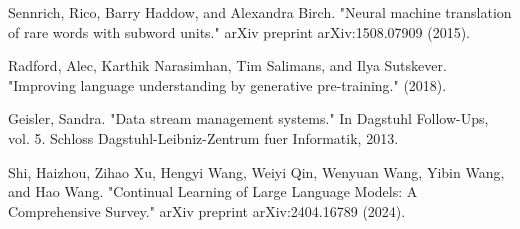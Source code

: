 \documentclass[t]{beamer}
\begin{document}
\begin{frame}
  \begin{thebibliography}{}
Sennrich, Rico, Barry Haddow, and Alexandra Birch. "Neural machine translation of rare words with subword units." arXiv preprint arXiv:1508.07909 (2015).

Radford, Alec, Karthik Narasimhan, Tim Salimans, and Ilya Sutskever. "Improving language understanding by generative pre-training." (2018).

Geisler, Sandra. "Data stream management systems." In Dagstuhl Follow-Ups, vol. 5. Schloss Dagstuhl-Leibniz-Zentrum fuer Informatik, 2013.

Shi, Haizhou, Zihao Xu, Hengyi Wang, Weiyi Qin, Wenyuan Wang, Yibin Wang, and Hao Wang. "Continual Learning of Large Language Models: A Comprehensive Survey." arXiv preprint arXiv:2404.16789 (2024).

  \end{thebibliography}
\end{frame}
\end{document}
